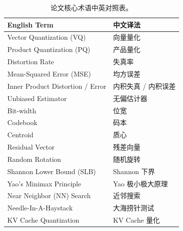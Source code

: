 \documentclass[11pt]{ctexart}
\begin{document}
\begin{table}[h]
\centering
\small
\setlength{\tabcolsep}{10pt}
\begin{tabular}{ll}
\toprule
\textbf{English Term} & \textbf{中文译法} \\
\midrule
Vector Quantization (VQ) & 向量量化 \\
Product Quantization (PQ) & 产品量化 \\
Distortion Rate & 失真率 \\
Mean-Squared Error (MSE) & 均方误差 \\
Inner Product Distortion / Error & 内积失真 / 内积误差 \\
Unbiased Estimator & 无偏估计器 \\
Bit-width & 位宽 \\
Codebook & 码本 \\
Centroid & 质心 \\
Residual Vector & 残差向量 \\
Random Rotation & 随机旋转 \\
Shannon Lower Bound (SLB) & Shannon 下界 \\
Yao's Minimax Principle & Yao 极小极大原理 \\
Near Neighbor (NN) Search & 近邻搜索 \\
Needle-In-A-Haystack & 大海捞针测试 \\
KV Cache Quantization & KV Cache 量化 \\
\bottomrule
\end{tabular}
\caption{论文核心术语中英对照表。}
\end{table}
\end{document}
